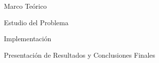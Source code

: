 \documentclass[a4paper,12pt]{report}
\begin{document}
\maketitle{}

\newpage
\tableofcontents{}

\newpage
\listoffigures{}

\newpage
\listoftables{}


\newpage
\begin{part}{Marco Teórico}
\newpage
\newpage
\end{part}
\begin{part}{Estudio del Problema}
\newpage
\newpage
\newpage

\newpage
\newpage
%
\end{part}
\begin{part}{Implementación}
\newpage
\newpage
\end{part}
\begin{part}{Presentación de Resultados y Conclusiones Finales}
\newpage

\newpage

\newpage
\end{part}
\end{document}
